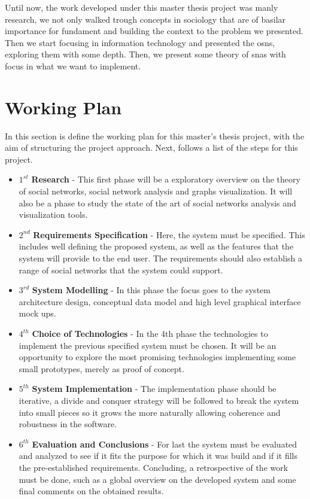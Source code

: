 Until now, the work developed under this master thesis project was manly research, we not only walked trough concepts in sociology that are of basilar importance
for fundament and building the context to the problem we presented. Then we start focusing in information technology and presented the \glspl{osn}, exploring them
with some depth. Then, we present some theory of \glspl{sna} with focus in what we want to implement.

\section{Working Plan}

In this section is define the working plan for this master's thesis project, with the aim of structuring the project approach. Next, follows a list of the steps for this project.

\begin{itemize}
\item $1^{st}$ \textbf{Research} - This first phase will be a exploratory overview on the theory of social networks, social network analysis and graphs visualization. It will also be a phase to study the state of the art of
social networks analysis and visualization tools.
\item $2^{nd}$ \textbf{Requirements Specification} - Here, the system must be specified. This includes well defining the proposed system, as well as the features that the system will provide to the end user. The requirements should also establish a range of social networks that the system could support.
\item $3^{rd}$ \textbf{System Modelling} - In this phase the focus goes to the system architecture design, conceptual data model and high level graphical interface mock ups.
\item $4^{th}$ \textbf{Choice of Technologies} - In the 4th phase the technologies to implement the previous specified system must be chosen. It will be an opportunity to explore the
most promising technologies implementing some small prototypes, merely as proof of concept.
\item $5^{th}$ \textbf{System Implementation} - The implementation phase should be iterative, a divide and conquer strategy will be followed to break the system into small pieces so it grows the more naturally allowing
coherence and robustness in the software.
\item $6^{th}$ \textbf{Evaluation and Conclusions} - For last the system must be evaluated and analyzed to see if it fits the purpose for which it was build and if it fills the pre-established requirements. Concluding, a retrospective of the work must be done, such as a global overview on the developed system and some final comments on the obtained results.
\end{itemize}

